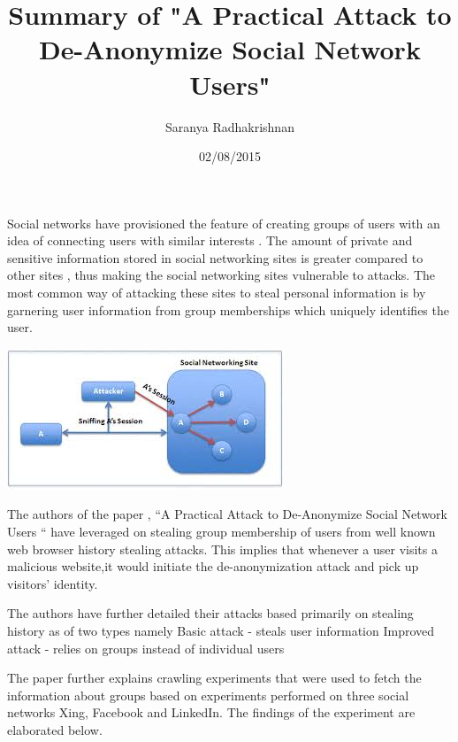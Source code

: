 \documentclass{article}
\title{Summary of  "A Practical Attack to De-Anonymize Social Network Users"}
\author{Saranya Radhakrishnan}
\date{02/08/2015}
\begin{document}
\maketitle
\justify

Social networks have provisioned the feature of creating  groups of users with an idea of  connecting users with similar interests . The amount of private and sensitive information stored in social networking sites is greater compared to other sites , thus making the social networking sites vulnerable to attacks. The most common way of attacking these sites to steal personal information is by garnering user information from group memberships which uniquely identifies the user. 

\begin{center}
\includegraphics{AttackInGraphicalFormat}
\end{center}


The authors of the paper , “A Practical Attack to De-Anonymize Social Network Users “  have leveraged on stealing group membership of users from well known web browser history stealing attacks. This implies that whenever a user visits a malicious website,it would initiate the de-anonymization attack and pick up visitors’ identity.


The authors have further detailed their attacks based primarily on stealing history as of two types namely
 Basic attack - steals user information
 Improved attack - relies on groups instead of individual users


The paper further explains crawling experiments that were used to fetch the information about 
groups based on experiments performed on three social networks Xing, Facebook and LinkedIn. The findings of the experiment are elaborated below.
\end{document}
